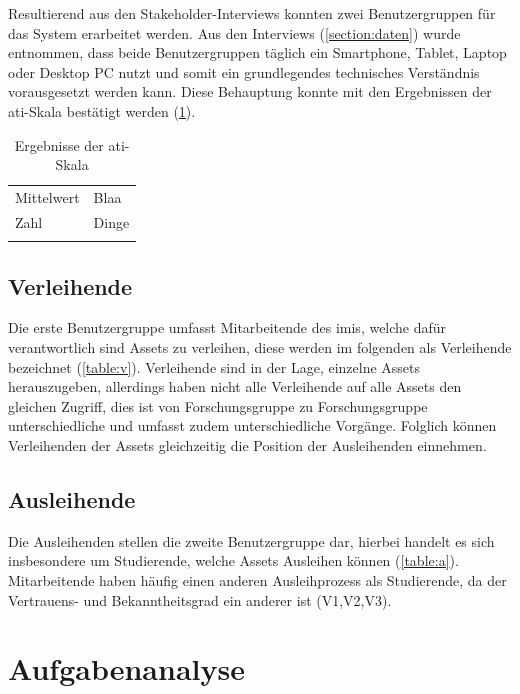 Resultierend aus den Stakeholder-Interviews konnten zwei Benutzergruppen für das System erarbeitet
werden. Aus den Interviews (\ref{section:daten}) wurde entnommen, dass beide Benutzergruppen täglich
ein Smartphone, Tablet, Laptop oder Desktop PC nutzt und somit ein grundlegendes technisches
Verständnis vorausgesetzt werden kann. Diese Behauptung konnte mit den Ergebnissen der
\ac{ati}-Skala bestätigt werden (\ref{table:ati}).

\begin{table}[h]
        \centering 
        \caption{Ergebnisse der \ac{ati}-Skala}
        \begin{tabular}{ll}
            \arrayrulecolor{maincolor}\hline
            \sffamily\color{maincolor}Mittelwert & \sffamily\color{maincolor}Blaa \\
            \arrayrulecolor{maincolor}\hline
                Zahl  & Dinge\\
            \arrayrulecolor{maincolor}\hline
        \end{tabular}
        \label{table:ati}
    \end{table}


\subsection*{Verleihende}
Die erste Benutzergruppe umfasst Mitarbeitende des \ac{imis}, welche dafür verantwortlich sind
Assets zu verleihen, diese werden im folgenden als Verleihende bezeichnet (\ref{table:v}).
Verleihende sind in der Lage, einzelne Assets herauszugeben, allerdings haben nicht alle Verleihende
auf alle Assets den gleichen Zugriff, dies ist von Forschungsgruppe zu Forschungsgruppe
unterschiedliche und umfasst zudem unterschiedliche Vorgänge. Folglich können Verleihenden der
Assets gleichzeitig die Position der Ausleihenden einnehmen. 

\subsection*{Ausleihende}
Die Ausleihenden stellen die zweite Benutzergruppe dar, hierbei handelt es sich insbesondere um
Studierende, welche Assets Ausleihen können (\ref{table:a}). Mitarbeitende haben häufig einen
anderen Ausleihprozess als Studierende, da der Vertrauens- und Bekanntheitsgrad ein anderer ist
(V1,V2,V3). 

\section{Aufgabenanalyse}
\label{section:aufgaben}

